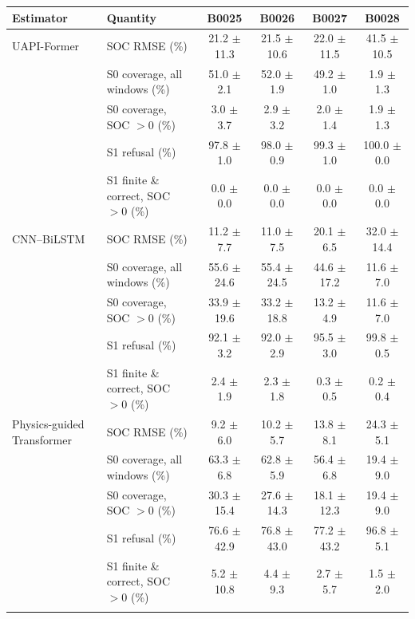 \begin{tabular}{llcccc}
\toprule
Estimator & Quantity & B0025 & B0026 & B0027 & B0028 \\
\midrule
UAPI-Former & SOC RMSE (\%) & 21.2 $\pm$ 11.3 & 21.5 $\pm$ 10.6 & 22.0 $\pm$ 11.5 & 41.5 $\pm$ 10.5 \\
 & S0 coverage, all windows (\%) & 51.0 $\pm$ 2.1 & 52.0 $\pm$ 1.9 & 49.2 $\pm$ 1.0 & 1.9 $\pm$ 1.3 \\
 & S0 coverage, SOC $>0$ (\%) & 3.0 $\pm$ 3.7 & 2.9 $\pm$ 3.2 & 2.0 $\pm$ 1.4 & 1.9 $\pm$ 1.3 \\
 & S1 refusal (\%) & 97.8 $\pm$ 1.0 & 98.0 $\pm$ 0.9 & 99.3 $\pm$ 1.0 & 100.0 $\pm$ 0.0 \\
 & S1 finite \& correct, SOC $>0$ (\%) & 0.0 $\pm$ 0.0 & 0.0 $\pm$ 0.0 & 0.0 $\pm$ 0.0 & 0.0 $\pm$ 0.0 \\
\addlinespace
CNN--BiLSTM & SOC RMSE (\%) & 11.2 $\pm$ 7.7 & 11.0 $\pm$ 7.5 & 20.1 $\pm$ 6.5 & 32.0 $\pm$ 14.4 \\
 & S0 coverage, all windows (\%) & 55.6 $\pm$ 24.6 & 55.4 $\pm$ 24.5 & 44.6 $\pm$ 17.2 & 11.6 $\pm$ 7.0 \\
 & S0 coverage, SOC $>0$ (\%) & 33.9 $\pm$ 19.6 & 33.2 $\pm$ 18.8 & 13.2 $\pm$ 4.9 & 11.6 $\pm$ 7.0 \\
 & S1 refusal (\%) & 92.1 $\pm$ 3.2 & 92.0 $\pm$ 2.9 & 95.5 $\pm$ 3.0 & 99.8 $\pm$ 0.5 \\
 & S1 finite \& correct, SOC $>0$ (\%) & 2.4 $\pm$ 1.9 & 2.3 $\pm$ 1.8 & 0.3 $\pm$ 0.5 & 0.2 $\pm$ 0.4 \\
\addlinespace
Physics-guided Transformer & SOC RMSE (\%) & 9.2 $\pm$ 6.0 & 10.2 $\pm$ 5.7 & 13.8 $\pm$ 8.1 & 24.3 $\pm$ 5.1 \\
 & S0 coverage, all windows (\%) & 63.3 $\pm$ 6.8 & 62.8 $\pm$ 5.9 & 56.4 $\pm$ 6.8 & 19.4 $\pm$ 9.0 \\
 & S0 coverage, SOC $>0$ (\%) & 30.3 $\pm$ 15.4 & 27.6 $\pm$ 14.3 & 18.1 $\pm$ 12.3 & 19.4 $\pm$ 9.0 \\
 & S1 refusal (\%) & 76.6 $\pm$ 42.9 & 76.8 $\pm$ 43.0 & 77.2 $\pm$ 43.2 & 96.8 $\pm$ 5.1 \\
 & S1 finite \& correct, SOC $>0$ (\%) & 5.2 $\pm$ 10.8 & 4.4 $\pm$ 9.3 & 2.7 $\pm$ 5.7 & 1.5 $\pm$ 2.0 \\
\addlinespace
\bottomrule
\end{tabular}
